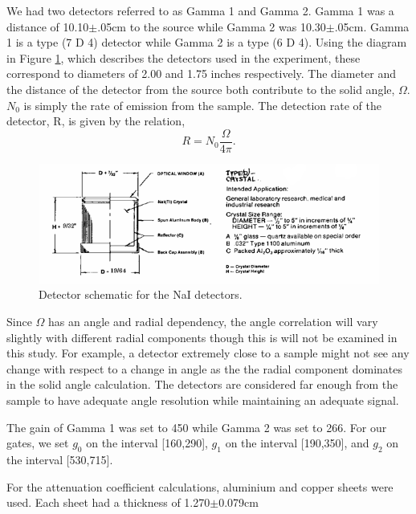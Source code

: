 \documentclass[10pt]{IEEEtran}
\begin{document}
We had two detectors referred to as Gamma 1 and Gamma 2. Gamma 1 was a distance of 10.10$\pm$.05cm to the source while Gamma 2 was 10.30$\pm$.05cm. Gamma 1 is a type (7 D 4) detector while Gamma 2 is a type (6 D 4). Using the diagram in Figure \ref{fig:detector}, which describes the detectors used in the experiment, these correspond to diameters of 2.00 and 1.75 inches respectively. The diameter and the distance of the detector from the source both contribute to the solid angle, $\Omega$. $N_0$ is simply the rate of emission from the sample.
The detection rate of the detector, R, is given by the relation\cite{columbia},
	\begin{equation}
		R = N_0 \frac{\Omega}{4\pi}.
	\end{equation}
    \begin{figure}[!hbt]
        \begin{center}
        \includegraphics[width=\columnwidth]{GMAimage012}
        \caption{Detector schematic for the NaI detectors\cite{harshaw}.}        
        \label{fig:detector}
        \end{center}
    \end{figure}   

Since $\Omega$ has an angle and radial dependency, the angle correlation will vary slightly with different radial components though this is will not be examined in this study. For example, a detector extremely close to a sample might not see any change with respect to a change in angle as the the radial component dominates in the solid angle calculation. The detectors are considered far enough from the sample to have adequate angle resolution while maintaining an adequate signal.

The gain of Gamma 1 was set to 450 while Gamma 2 was set to 266. For our gates, we set $g_0$ on the interval [160,290], $g_1$ on the interval [190,350], and $g_2$ on the interval [530,715].

For the attenuation coefficient calculations, aluminium and copper sheets were used. Each sheet had a thickness of 1.270$\pm$0.079cm
\end{document}
